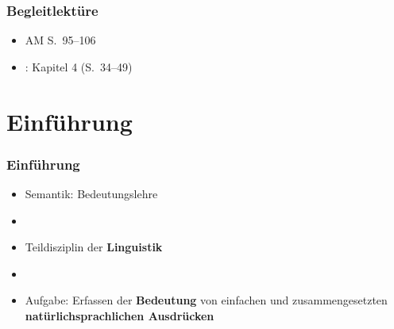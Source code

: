 \nocite{Loebner15a} %
\nocite{Loebner15b} %
\nocite{Lohnstein11} %
\nocite{MyP16a} %
\nocite{Partee&Co93a} %
\nocite{ZimmermannT&Sternefeld13a} %


\begin{frame}
\frametitle{Begleitlektüre}

\begin{itemize}
	\item AM S.~95--106
	\item \citet{Lohnstein11}: Kapitel 4 (S.~34--49)
\end{itemize}
\end{frame}


%
\section{Einführung}
%

\begin{frame}
\frametitle{Einführung}

\begin{itemize}
	\item Semantik: Bedeutungslehre
	\item []
	\item Teildisziplin der \textbf{Linguistik} 
	\item[]
	\item Aufgabe: Erfassen der \textbf{Bedeutung} von einfachen und zusammengesetzten \textbf{natürlichsprachlichen Ausdrücken} 

\end{itemize}

\end{frame}


